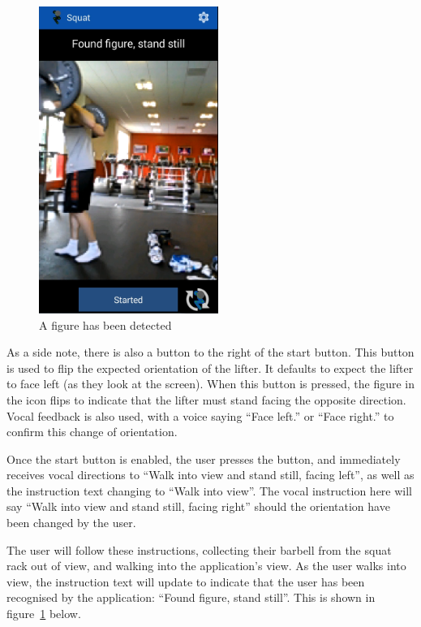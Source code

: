 \begin{figure}[H]
    \centering
	\includegraphics[height=10cm]{application/images/foundfigure}
\caption{A figure has been detected}
\label{fig:foundfigure}
\end{figure}

As a side note, there is also a button to the right of the start button. This button is used to flip the expected orientation of the lifter. It defaults to expect the lifter to face left (as they look at the screen). When this button is pressed, the figure in the icon flips to indicate that the lifter must stand facing the opposite direction. Vocal feedback is also used, with a voice saying ``Face left.'' or ``Face right.'' to confirm this change of orientation.

Once the start button is enabled, the user presses the button, and immediately receives vocal directions to ``Walk into view and stand still, facing left'', as well as the instruction text changing to ``Walk into view''. The vocal instruction here will say ``Walk into view and stand still, facing right'' should the orientation have been changed by the user.

The user will follow these instructions, collecting their barbell from the squat rack out of view, and walking into the application's view. As the user walks into view, the instruction text will update to indicate that the user has been recognised by the application: ``Found figure, stand still''. This is shown in figure~\ref{fig:foundfigure} below.

